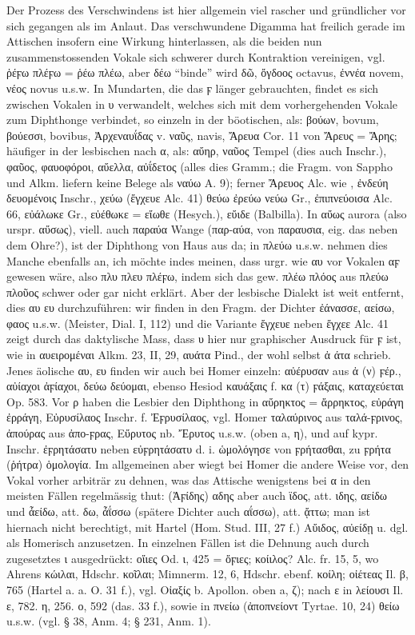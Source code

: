 Der Prozess des Verschwindens ist hier allgemein viel rascher und gründlicher
vor sich gegangen als im Anlaut. Das verschwundene Digamma hat freilich gerade
im Attischen insofern eine Wirkung hinterlassen, als die beiden nun
zusammenstossenden Vokale sich schwerer durch Kontraktion vereinigen, vgl. ῥέϝω
πλέϝω = ῥέω πλέω, aber δέω “binde” wird δῶ, ὄγδοος octavus, ἐννέα novem, νέος
novus u.s.w. In Mundarten, die das ϝ länger gebrauchten, findet es sich
zwischen Vokalen in υ verwandelt, welches sich mit dem vorhergehenden Vokale zum
Diphthonge verbindet, so einzeln in der böotischen, als: βούων, bovum, βούεσσι,
bovibus, Ἀρχεναυΐδας v. ναῦς, navis, Ἄρευα Cor. 11 von Ἄρευς = Ἄρης; häufiger in
der lesbischen nach α, als: αὔηρ, ναῦος Tempel (dies auch Inschr.), φαῦος,
φαυοφόροι, αὔελλα, αὐΐδετος (alles dies Gramm.; die Fragm. von Sappho und Alkm.
liefern keine Belege als ναύω A. 9); ferner Ἄρευος Alc. wie , ἐνδεύη
δευομένοις Inschr., χεύω (ἔγχευε Alc. 41) θεύω ἐρεύω νεύω Gr., ἐπιπνεύοισα Alc.
66, εὐάλωκε Gr., εὐέθωκε = εἴωθε (Hesych.), εὔιδε (Balbilla). In αὔως aurora
(also urspr. αὔσως), viell. auch παραύα Wange (παρ-αύα, von παραυσια, eig. das
neben dem Ohre?), ist der Diphthong von Haus aus da; in πλεύω u.s.w. nehmen
dies Manche ebenfalls an, ich möchte indes meinen, dass urgr. wie  αυ vor
Vokalen αϝ gewesen wäre, also πλυ πλευ πλέϝω, indem sich das gew. πλέω πλόος aus
πλεύω πλοῦος schwer oder gar nicht erklärt. Aber der lesbische Dialekt ist weit
entfernt, dies αυ ευ durchzuführen: wir finden in den Fragm. der Dichter
ἐάνασσε, αείσω, φαος u.s.w. (Meister, Dial. I, 112) und die Variante ἔγχευε
neben ἔγχεε Alc. 41 zeigt durch das daktylische Mass, dass υ hier nur
graphischer Ausdruck für ϝ ist, wie in αυειρομέναι Alkm. 23, II, 29, αυάτα
Pind., der wohl selbst ἀ άτα schrieb. Jenes äolische αυ, ευ finden wir auch bei
Homer einzeln: αὐέρυσαν aus ἀ (ν) ϝέρ., αὐίαχοι ἀϝίαχοι, δεύω δεύομαι, ebenso
Hesiod καυάξαις f. κα (τ) ϝάξαις, καταχεύεται Op. 583. Vor ρ haben die Lesbier
den Diphthong in αὔρηκτος = ἄρρηκτος, εὐράγη ἐρράγη, Εὐρυσίλαος Inschr. f.
Ἐϝρυσίλαος, vgl. Homer ταλαύρινος aus ταλά-ϝρινος, ἀπούρας aus ἀπο-ϝρας, Εὔρυτος
nb. Ἔρυτος u.s.w. (oben a, η), und auf kypr. Inschr. ἐϝρητάσατυ neben
εὐϝρητάσατυ d. i. ὡμολόγησε von ϝρήτασθαι, zu ϝρήτα (ῥήτρα) ὁμολογία. Im
allgemeinen aber wiegt bei Homer die andere Weise vor, den Vokal vorher arbiträr
zu dehnen, was das Attische wenigstens bei α in den meisten Fällen regelmässig
thut: (Ἀϝίδης) αδης aber auch ϊδος, att. ιδης, αείδω und ἆείδω, att. δω, ἆΐσσω
(spätere Dichter auch αΐσσω), att. ᾄττω; man ist hiernach nicht berechtigt, mit
Hartel (Hom. Stud. III, 27 f.) Αὔιδος, αὐείδῃ u. dgl. als Homerisch anzusetzen.
In einzelnen Fällen ist die Dehnung auch durch zugesetztes ι ausgedrückt: οἴιες
Od. ι, 425 = ὄϝιες; κοίιλος? Alc. fr. 15, 5, wo Ahrens κώιλαι, Hdschr. κοῖλαι;
Mimnerm. 12, 6, Hdschr. ebenf. κοίλη; οἰέτεας Il. β, 765 (Hartel a. a. O. 31
f.), vgl. Οἰαξίς b. Apollon. oben a, ζ); nach ε in λείουσι Il. ε, 782. η, 256.
ο, 592 (das. 33 f.), sowie in πνείω (ἀποπνείοντ Tyrtae. 10, 24) θείω u.s.w.
(vgl. § 38, Anm. 4; § 231, Anm. 1). 


